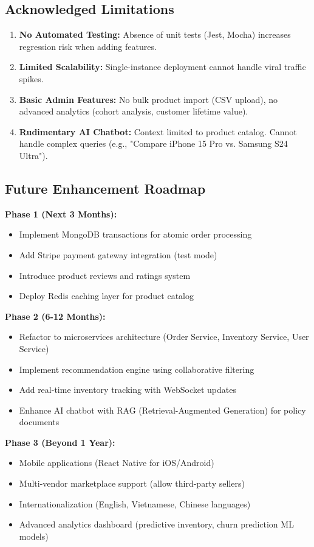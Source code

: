 \documentclass[12pt, a4paper]{report}
\begin{document}
\subsection{Acknowledged Limitations}

\begin{enumerate}
    \item \textbf{No Automated Testing:} Absence of unit tests (Jest, Mocha) increases regression risk when adding features.
    \item \textbf{Limited Scalability:} Single-instance deployment cannot handle viral traffic spikes.
    \item \textbf{Basic Admin Features:} No bulk product import (CSV upload), no advanced analytics (cohort analysis, customer lifetime value).
    \item \textbf{Rudimentary AI Chatbot:} Context limited to product catalog. Cannot handle complex queries (e.g., "Compare iPhone 15 Pro vs. Samsung S24 Ultra").
\end{enumerate}

\subsection{Future Enhancement Roadmap}

\textbf{Phase 1 (Next 3 Months):}
\begin{itemize}
    \item Implement MongoDB transactions for atomic order processing
    \item Add Stripe payment gateway integration (test mode)
    \item Introduce product reviews and ratings system
    \item Deploy Redis caching layer for product catalog
\end{itemize}

\textbf{Phase 2 (6-12 Months):}
\begin{itemize}
    \item Refactor to microservices architecture (Order Service, Inventory Service, User Service)
    \item Implement recommendation engine using collaborative filtering
    \item Add real-time inventory tracking with WebSocket updates
    \item Enhance AI chatbot with RAG (Retrieval-Augmented Generation) for policy documents
\end{itemize}

\textbf{Phase 3 (Beyond 1 Year):}
\begin{itemize}
    \item Mobile applications (React Native for iOS/Android)
    \item Multi-vendor marketplace support (allow third-party sellers)
    \item Internationalization (English, Vietnamese, Chinese languages)
    \item Advanced analytics dashboard (predictive inventory, churn prediction ML models)
\end{itemize}
\end{document}
